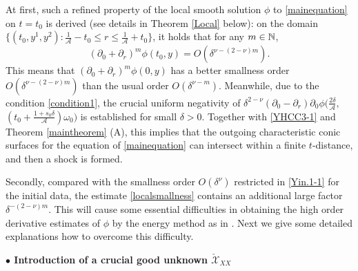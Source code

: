 \documentclass[11pt,twoside]{article}
\begin{document}
At first, such a refined  property of the local smooth solution $\phi$ to \eqref{mainequation}
on \(t=t_0\) is derived (see details in Theorem \ref{Local} below): on the domain
$\{(t_0, y^1,y^2): \frac{1}{\mathcal{A}}-t_0\leq r\leq\frac{1}{\mathcal{A}}+t_0\}$,
it holds that for any $m\in\Bbb N$,
\begin{equation}\label{localsmallness}
(\partial_{0}+\partial_r)^m \phi(t_0,y)
=O(\delta^{\nu-(2-\nu)m}).
\end{equation}
This means that $(\partial_{0}+\partial_r)^m\phi(0, y)$ has a better smallness order $O(\delta^{\nu-(2-\nu)m})$ than the
usual order $O(\delta^{\nu-m})$. Meanwhile, due to the condition \eqref{condition1}, the crucial uniform negativity of  $\delta^{2-\nu}(\partial_{0}-\partial_r)\partial_{0}\phi(\frac{2\delta}{\mathcal{A}},$ $(t_0+\frac{1+s_0\delta}{\mathcal A})\omega_0)$
is established for small $\delta>0$.
Together with \eqref{YHCC3-1} and Theorem \ref{maintheorem} (A), this implies
that the outgoing characteristic conic surfaces for the equation of \eqref{mainequation} can intersect within a finite $t$-distance,
and then a shock is formed.

Secondly, compared with the smallness order $O(\delta^{\nu})$ restricted in \eqref{Yin.1-1} for the initial data,
the estimate \eqref{localsmallness} contains an additional large factor $\delta^{-(2-\nu)m}$. This will cause some
essential difficulties in obtaining the high order derivative estimates of $\phi$
by the energy method as in \cite{M-Y, L-Y}. Next we give some detailed explanations how to
overcome this difficulty.


\medskip
\textbf{$\bullet$ Introduction of a crucial good unknown $\check{\mathscr{X}}_{XX}$}
\medskip
\end{document}
